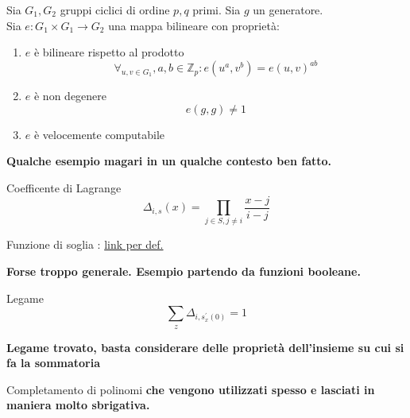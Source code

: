 \begin{defi}
Sia $G_1,G_2$ gruppi ciclici di ordine $p,q$ primi. Sia $g$ un generatore.\\
Sia $e : G_1 \times G_1 \rightarrow G_2$ una mappa bilineare con proprietà:
\begin{enumerate}
\item $e$ è bilineare rispetto al prodotto
\[ \forall_{u,v \in G_1}, a,b \in \mathbb{Z}_p : e(u^a,v^b) = e(u,v)^{ab} \]
\item $e$ è non degenere \[e(g,g) \neq 1\]
\item $e$ è velocemente computabile
\end{enumerate}
\end{defi}
\textbf{Qualche esempio magari in un qualche contesto ben fatto.}

\begin{defi}
Coefficente di Lagrange
\[ \Delta_{i,s}(x) = \prod_{j\in S , j \neq i} \dfrac{x-j}{i-j} \]
\end{defi}

\begin{defi}
Funzione di soglia : \href{http://www.contrib.andrew.cmu.edu/~ryanod/?p=856}{link per def.} 
\end{defi}
\textbf{Forse troppo generale. Esempio partendo da funzioni booleane.}


\begin{prop}
Legame
\[\sum_z \Delta_{i,s_x^\prime(0)} = 1\]
\end{prop}
\textbf{Legame trovato, basta considerare delle proprietà dell'insieme su cui si fa la sommatoria}

\begin{prop}
Completamento di polinomi \textbf{che vengono utilizzati spesso e lasciati in maniera molto sbrigativa.} 
\end{prop} 